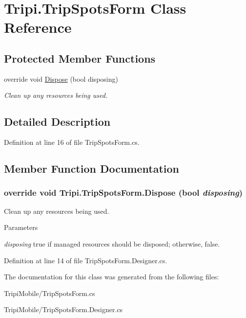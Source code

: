 \hypertarget{class_tripi_1_1_trip_spots_form}{
\section{Tripi.TripSpotsForm Class Reference}
\label{class_tripi_1_1_trip_spots_form}
}
\subsection*{Protected Member Functions}
\begin{DoxyCompactItemize}
\item 
override void \hyperlink{class_tripi_1_1_trip_spots_form_ae281007589617eb46c169359cbd970eb}{Dispose} (bool disposing)
\begin{DoxyCompactList}\small\item\em Clean up any resources being used. \item\end{DoxyCompactList}\end{DoxyCompactItemize}


\subsection{Detailed Description}


Definition at line 16 of file TripSpotsForm.cs.

\subsection{Member Function Documentation}
\hypertarget{class_tripi_1_1_trip_spots_form_ae281007589617eb46c169359cbd970eb}{
\subsubsection[{Dispose}]{\setlength{\rightskip}{0pt plus 5cm}override void Tripi.TripSpotsForm.Dispose (bool {\em disposing})}}
\label{class_tripi_1_1_trip_spots_form_ae281007589617eb46c169359cbd970eb}


Clean up any resources being used. 
\begin{DoxyParams}{Parameters}
\item[{\em disposing}]true if managed resources should be disposed; otherwise, false.\end{DoxyParams}


Definition at line 14 of file TripSpotsForm.Designer.cs.

The documentation for this class was generated from the following files:\begin{DoxyCompactItemize}
\item 
TripiMobile/TripSpotsForm.cs\item 
TripiMobile/TripSpotsForm.Designer.cs\end{DoxyCompactItemize}
